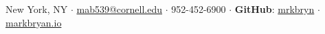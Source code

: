 {
\small \noindent
\centering
New York, NY
$\cdot$
\href{mailto:mab539@cornell.edu}{mab539@cornell.edu}
$\cdot$
952-452-6900
$\cdot$
{\bfseries\small GitHub}: \href{https://github.com/mrkbryn}{mrkbryn}
$\cdot$
\href{http://markbryan.io/}{markbryan.io}
\hfill

}
